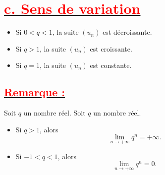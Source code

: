 \documentclass{article}
\begin{document}
\section*{\underline{\textbf{\textcolor{red}{c. Sens de variation}}}}
    \begin{itemize}
        \item Si $0 < q < 1$, la suite $\left(u_{n}\right)$ est décroissante.
        \item Si $q > 1$, la suite $\left(u_{n}\right)$ est croissante.
        \item Si $q=1$, la suite $\left(u_{n}\right)$ est constante.
    \end{itemize}


\subsection*{\underline{\textbf{\textcolor{red}{Remarque :}}}}
Soit $q$ un nombre réel.
Soit \( q \) un nombre réel.

\begin{itemize}
    \item Si \( q > 1 \), alors
    \[
    \lim_{n \rightarrow +\infty} q^n = +\infty.
    \]
    
    \item Si \( -1 < q < 1 \), alors
    \[
    \lim_{n \rightarrow +\infty} q^n = 0.
    \]
\end{itemize}
\end{document}
